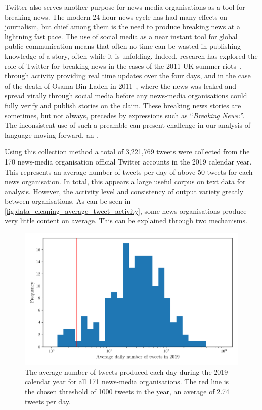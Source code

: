 Twitter also serves another purpose for news-media organisations as a tool for breaking news. The modern 24 hour news cycle has had many effects on journalism, but chief among them is the need to produce breaking news at a lightning fast pace. The use of social media as a near instant tool for global public communication means that often no time can be wasted in publishing knowledge of a story, often while it is unfolding. Indeed, research has explored the role of Twitter for breaking news in the cases of the 2011 UK summer riots~\cite{visTwitterReportingTool2013}, through activity providing real time updates over the four days, and in the case of the death of Osama Bin Laden in 2011~\cite{huBreakingNewsTwitter2012}, where the news was leaked and spread virally through social media before any news-media organisations could fully verify and publish stories on the claim. These breaking news stories are sometimes, but not always, precedes by expressions such as ``\emph{Breaking News:}''. The inconsistent use of such a preamble can present challenge in our analysis of language moving forward, an .

Using this collection method a total of 3,221,769 tweets were collected from the 170 news-media organisation official Twitter accounts in the 2019 calendar year. This represents an average number of tweets per day of above 50 tweets for each news organisation. In total, this appears a large useful corpus on text data for analysis. However, the activity level and consistency of output variety greatly between organisations. As can be seen in \autoref{fig:data_cleaning_average_tweet_activity}, some news organisations produce very little content on average. This can be explained through two mechanisms.

\begin{figure}
	\centering
	\includegraphics[width=0.7\linewidth]{chapter1/figs/averagetweetactivity}
	\caption{The average number of tweets produced each day during the 2019 calendar year for all 171 news-media organisations. The red line is the chosen threshold of 1000 tweets in the year, an average of 2.74 tweets per day.}
	\label{fig:data_cleaning_average_tweet_activity}
\end{figure}

